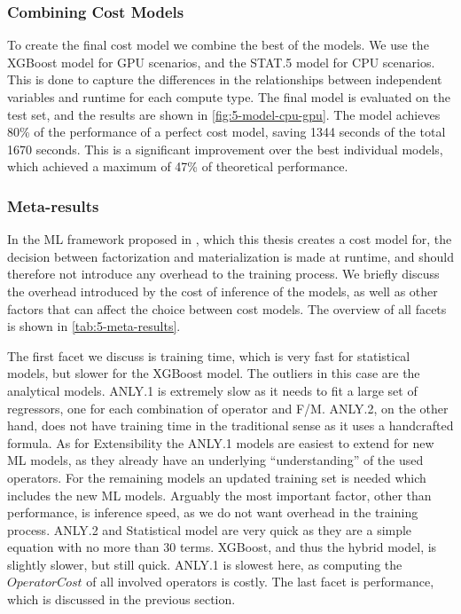 \subsubsection{Combining Cost Models}
\label{subsec:5-hybrid}
To create the final cost model we combine the best of the models. We use the XGBoost model for GPU scenarios, and the STAT.5 model for CPU scenarios. This is done to capture the differences in the relationships between independent variables and runtime for each compute type. The final model is evaluated on the test set, and the results are shown in \autoref{fig:5-model-cpu-gpu}. The model achieves 80\% of the performance of a perfect cost model, saving 1344 seconds of the total 1670 seconds. This is a significant improvement over the best individual models, which achieved a maximum of 47\% of theoretical performance.

\subsubsection{Meta-results}
In the ML framework proposed in \cite{amalur}, which this thesis creates a cost model for, the decision between factorization and materialization is made at runtime, and should therefore not introduce any overhead to the training process. We briefly discuss the overhead introduced by the cost of inference of the models, as well as other factors that can affect the choice between cost models. The overview of all facets is shown in \autoref{tab:5-meta-results}.

The first facet we discuss is training time, which is very fast for statistical models, but slower for the XGBoost model. The outliers in this case are the analytical models. ANLY.1 is extremely slow as it needs to fit a large set of regressors, one for each combination of operator and F/M. ANLY.2, on the other hand, does not have training time in the traditional sense as it uses a handcrafted formula. As for Extensibility the ANLY.1 models are easiest to extend for new ML models, as they already have an underlying “understanding” of the used operators. For the remaining models an updated training set is needed which includes the new ML models. Arguably the most important factor, other than performance, is inference speed, as we do not want overhead in the training process. ANLY.2 and Statistical model are very quick as they are a simple equation with no more than $30$ terms. XGBoost, and thus the hybrid model, is slightly slower, but still quick. ANLY.1 is slowest here, as computing the $OperatorCost$ of all involved operators is costly. The last facet is performance, which is discussed in the previous section.

